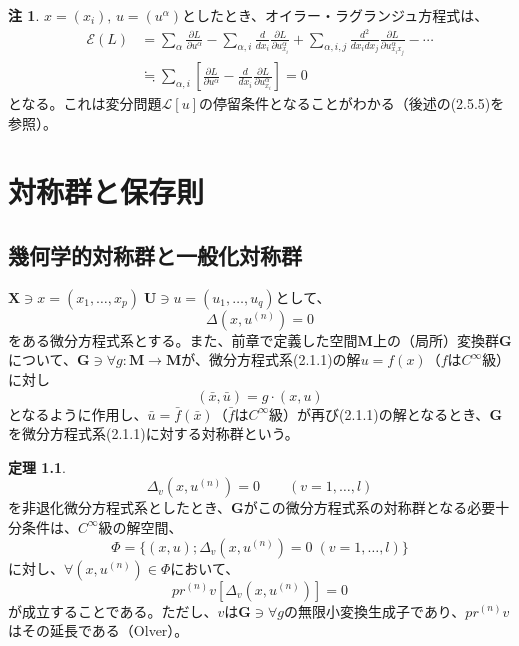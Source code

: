 \documentclass[a4paper, 11pt]{report}
\theoremstyle{definition}
\newtheorem{theorem}{定理}[section]
\newtheorem*{remark*}{注}
\begin{document}
\begin{remark*}
 $x=(x_i), \, u=(u^\alpha )$としたとき、オイラー・ラグランジュ方程式は、
\begin{align}
\mathcal{E}(L) &= \sum_\alpha\frac{\partial L}{\partial u^\alpha} - \sum_{\alpha ,i}\frac{d}{dx_i}\frac{\partial L}{\partial u_{x_i}^\alpha} + \sum_{\alpha ,i,j}\frac{d^2}{dx_idx_j}\frac{\partial L}{\partial u_{x_ix_j}^\alpha} - \cdots\nonumber\\
&\fallingdotseq \sum_{\alpha ,i}[\frac{\partial L}{\partial u^\alpha} - \frac{d}{dx_i}\frac{\partial L}{\partial u_{x_i}^\alpha}] = 0
\end{align}
となる。これは変分問題$\mathcal{L}[u]$の停留条件となることがわかる（後述の(2.5.5)を参照）。
\end{remark*}

\newpage

\chapter{対称群と保存則}

\section{幾何学的対称群と一般化対称群}

 $\mathbf{X}\ni x=(x_1,\dots,x_p)\; \mathbf{U}\ni u=(u_1,\dots,u_q)$として、
\begin{equation}
\varDelta(x,u^{(n)}) = 0 %
\end{equation}
をある微分方程式系とする。また、前章で定義した空間$\mathbf{M}$上の（局所）変換群$\mathbf{G}$について、$\mathbf{G}\ni \forall g:\mathbf{M}\longrightarrow \mathbf{M}$が、微分方程式系(2.1.1)の解$u=f(x)$（$f$は$C^\infty$級）に対し
\begin{equation*}
(\bar{x},\bar{u}) = g\cdot (x,u)
\end{equation*}
となるように作用し、$\bar{u}=\bar{f}(\bar{x})$（$\bar{f}$は$C^\infty$級）が再び(2.1.1)の解となるとき、$\mathbf{G}$を微分方程式系(2.1.1)に対する対称群という。

\begin{theorem}
\begin{equation*}
\varDelta_v(x,u^{(n)}) = 0\qquad (v=1,\dots,l)
\end{equation*}
を非退化微分方程式系としたとき、$\mathbf{G}$がこの微分方程式系の対称群となる必要十分条件は、$C^\infty$級の解空間、
\begin{equation*}
\Phi = \{ (x,u); \varDelta_v(x,u^{(n)}) = 0\; (v=1,\dots,l) \}
\end{equation*}
に対し、$\forall (x,u^{(n)})\in \Phi$において、
\begin{equation}
pr^{(n)}v[\varDelta_v(x,u^{(n)})] = 0 %
\end{equation}
が成立することである。ただし、$v$は$\mathbf{G}\ni \forall g$の無限小変換生成子であり、$pr^{(n)}v$はその延長である（Olver\cite[Chap.2]{Olver4}）。
\end{theorem}
\end{document}
